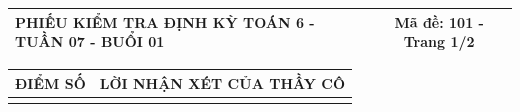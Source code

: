 \documentclass[12pt,a4paper]{article}
\begin{document}
\pagestyle{empty}

\noindent
\begin{tabularx}{\linewidth}{|X|c|}
\hline
\textbf{PHIẾU KIỂM TRA ĐỊNH KỲ TOÁN 6 - TUẦN 07 - BUỔI 01} & \textbf{Mã đề: 101 - Trang 1/2} \\
\hline
\end{tabularx}

\vspace{1mm}

\noindent
\begin{tabularx}{\linewidth}{|p{3.2cm}|X|}
\hline
\centering\textbf{ĐIỂM SỐ} & \centering\textbf{LỜI NHẬN XÉT CỦA THẦY CÔ} \tabularnewline
\hline
\rule{0pt}{1.8cm} & \tabularnewline
\hline
\end{tabularx}

\vspace{1.2mm}
\end{document}
